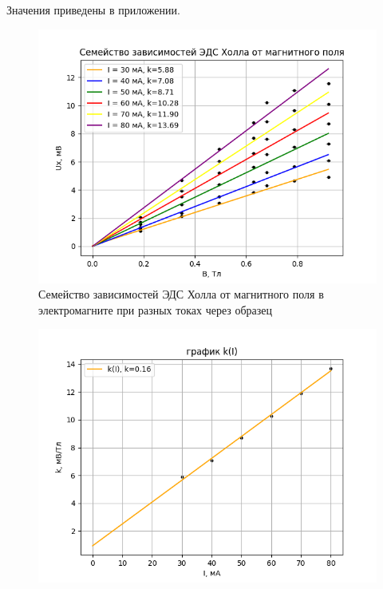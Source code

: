 \documentclass[a4paper, 10pt, twocolumn]{article}
\begin{document}
    Значения приведены в приложении.

    \begin{figure}[H]
        \centering
        \includegraphics[width=1\linewidth]{graphs/figure2.png}
        \begin{center}
            \caption{Семейство зависимостей ЭДС Холла от магнитного поля в электромагните при разных токах через образец}
        \end{center}
    \end{figure}
    
    \begin{figure}[H]
        \centering
        \includegraphics[width=1\linewidth]{graphs/figure3.png}
    \end{figure}
    
\end{document}
